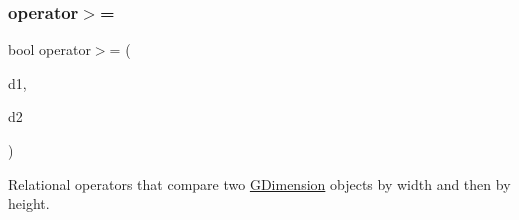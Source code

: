 \subsubsection{\texorpdfstring{operator$>$=}{operator>=}}
{\footnotesize\ttfamily bool operator$>$= (\begin{DoxyParamCaption}\item[{const \mbox{\hyperlink{classGDimension}{G\+Dimension}} \&}]{d1,  }\item[{const \mbox{\hyperlink{classGDimension}{G\+Dimension}} \&}]{d2 }\end{DoxyParamCaption})\hspace{0.3cm}{\ttfamily [friend]}}



Relational operators that compare two \mbox{\hyperlink{classGDimension}{G\+Dimension}} objects by width and then by height. 

